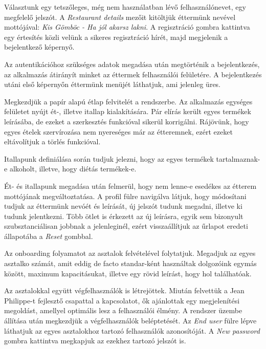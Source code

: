 
Választunk egy tetszőleges, még nem használatban lévő felhasználónevet, egy megfelelő jelszót. A \emph{Restaurant details} mezőit kitöltjük éttermünk nevével mottójával: \emph{Kis Gömböc - Ha jól akarsz lakni}. A regisztráció gombra kattintva egy értesítés közli velünk a sikeres regisztráció hírét, majd megjelenik a bejelentkező képernyő.


Az autentikációhoz szükséges adatok megadása után megtörténik a bejelentkezés, az alkalmazás átirányít minket az éttermek felhasználói felületére. A bejelentkezés utáni első képernyőn éttermünk menüjét láthatjuk, ami jelenleg üres.


Megkezdjük a papír alapú étlap felvitelét a rendszerbe. Az alkalmazás egységes felületet nyújt ét-, illetve itallap kialakítására. Pár elírás került egyes termékek leírásába, de ezeket a szerkesztés funkcióval sikerül korrigálni. Rájövünk, hogy egyes ételek szervírozása nem nyereséges már az étteremnek, ezért ezeket eltávolítjuk a törlés funkcióval.


Itallapunk definiálása során tudjuk jelezni, hogy az egyes termékek tartalmaznak-e alkoholt, illetve, hogy diétás termékek-e.


Ét- és itallapunk megadása után felmerül, hogy nem lenne-e esedékes az étterem mottójának megváltoztatása. A profil fülre navigálva látjuk, hogy módosítani tudjuk az éttermünk nevóét és leírását, új jelszót tudunk megadni, illetve ki tudunk jelentkezni. Több ötlet is érkezett az új leírásra, egyik sem bizonyult szubsztanciálisan jobbnak a jelenleginél, ezért visszaállítjuk az űrlapot eredeti állapotába a \emph{Reset} gombbal.


Az onboarding folyamatot az asztalok felvételével folytatjuk. Megadjuk az egyes asztalko számát, amit eddig de facto standar-ként használtak dolgozóink egymás között, maximum kapacitásukat, illetve egy rövid leírást, hogy hol találhatóak.


Az asztalokkal együtt végfelhasználók is létrejöttek. Miután felvettük a Jean Philippe-t fejlesztő csapattal a kapcsolatot, ők ajánlottak egy megjelenítési megoldást, amellyel optimális lesz a felhasználói élmény. A rendszer üzembe állítása után megkezdjük a végfelhasználók beléptetését. Az \emph{End user} fülre lépve láthatjuk az egyes asztalokhoz tartozó felhasználók azonosítóját. A \emph{New password} gombra kattintva megkapjuk az ezekhez tartozó jelszót is.

